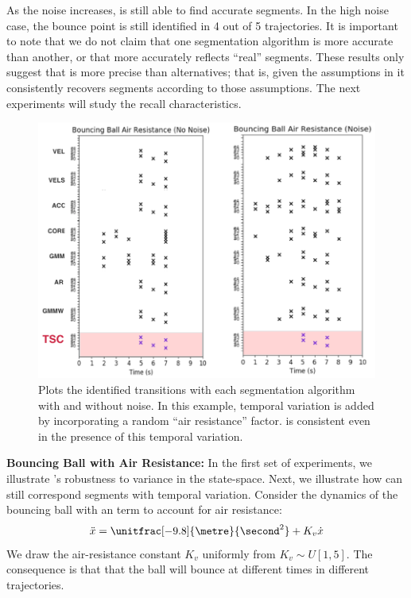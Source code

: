 As the noise increases, \tsc is still able to find accurate segments.
In the high noise case, the bounce point is still identified in 4 out of 5 trajectories.
It is important to note that we do not claim that one segmentation algorithm is more accurate than another, or that \tsc more accurately reflects ``real'' segments.
These results only suggest that \tsc is more precise than alternatives; that is, given the assumptions in \tsc it consistently recovers segments according to those assumptions.
The next experiments will study the recall characteristics.

\begin{figure}[ht!]%
\centering
\includegraphics[width=\columnwidth]{tsc-experiments/ball-results2.png}
\caption{Plots the identified transitions with each segmentation algorithm with and without noise. In this example, temporal variation is added by incorporating a random ``air resistance'' factor.
\tsc is consistent even in the presence of this temporal variation. \label{ball-results2}}
\end{figure}

\textbf{Bouncing Ball with Air Resistance: }
In the first set of experiments, we illustrate \tsc's robustness to variance in the state-space.
Next, we illustrate how \tsc can still correspond segments with temporal variation.
Consider the dynamics of the bouncing ball with an term to account for air resistance:
\[ \ddot{x} = \unitfrac[-9.8]{\metre}{\second^2} + K_v \dot{x} \]
We draw the air-resistance constant $K_v$ uniformly from $K_v \sim U[1,5]$.
The consequence is that that the ball will bounce at different times in different trajectories.

